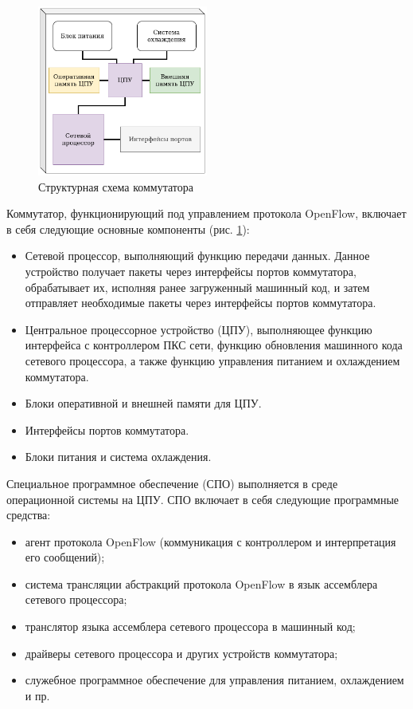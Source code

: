 \documentclass[oneside,final,12pt]{extarticle}
\begin{document}
        \begin{figure}[htb!]
            \centering
            \includegraphics[width=0.5\textwidth]{switch}
            \caption{Структурная схема коммутатора}
            \label{image_switch}
        \end{figure}

        Коммутатор, функционирующий под управлением протокола OpenFlow, 
        включает в себя следующие основные компоненты (рис. \ref{image_switch}):
        
        \begin{itemize}
            \item Сетевой процессор, выполняющий функцию передачи данных. Данное устройство получает пакеты через интерфейсы портов коммутатора, обрабатывает их, исполняя ранее загруженный машинный код, и затем отправляет необходимые пакеты через интерфейсы портов коммутатора.
            \item Центральное процессорное устройство (ЦПУ), выполняющее функцию интерфейса с контроллером ПКС сети, функцию обновления машинного кода сетевого процессора, а также функцию управления питанием и охлаждением коммутатора.
            \item Блоки оперативной и внешней памяти для ЦПУ.
            \item Интерфейсы портов коммутатора.
            \item Блоки питания и система охлаждения.
        \end{itemize}

        Специальное программное обеспечение (СПО) выполняется в среде операционной системы на ЦПУ. 
        СПО включает в себя следующие программные средства: 
        
        \begin{itemize}
            \item агент протокола OpenFlow (коммуникация с контроллером и интерпретация его сообщений);
            \item система трансляции абстракций протокола OpenFlow в язык ассемблера сетевого процессора;
            \item транслятор языка ассемблера сетевого процессора в машинный код;
            \item драйверы сетевого процессора и других устройств коммутатора;
            \item служебное программное обеспечение для управления питанием, охлаждением и пр.
        \end{itemize}
\end{document}
